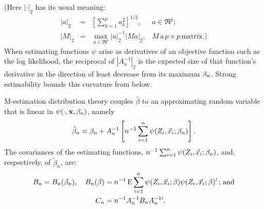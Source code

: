 \documentclass{article}
\theoremstyle{remark}
\begin{document}
(Here $| \cdot |_{2}$ has its usual meaning:
\begin{equation*}
  \begin{array}{rclr}
    |{a}|_{2} & = & \left[ \sum_{k=1}^{p} a_{k}^{2} \right]^{1/2}, & a \in \Re^{p};\\    |M|_{2} & = & \max_{a \in \Re^{p} } {|a|_{2}^{-1}}{|Ma|_{2}},& M\, \mathrm{a}\, p\times p\, \mathrm{matrix}.)
  \end{array}
\end{equation*}
When estimating functions $\psi$ arise as derivatives of an objective function such as the log likelihood, the reciprocal of $|{A}_{n}^{-1}|_{2}$ is the expected size of that function's derivative in the direction of least decrease from its maximum $\beta_{n }$. 
Strong estimability bounds this curvature from below.

M-estimation distribution theory couples $\hat\beta$ to an approximating random variable that is linear in $\psi(\cdot, \mathbf{x}, \beta_{n })$, namely 
\begin{equation}
  \label{eq:22}
  \tilde{\beta}_{n} \equiv \beta_{n } + A_{n}^{-1} \left[n^{-1}\sum_{i=1}^{n} \psi(Z_{i}, \vec{x}_{i}; \beta_{n } )\right].  
\end{equation}
The covariances of the estimating functions, $n^{-1} \sum_{i=1}^{n} \psi(Z_{i}, \vec{x}_{i}; \beta_{n } )$, and, respectively, of $\tilde{\beta}_{n}$, are: 
\begin{align}
\label{eq:13}
B_{n}  =  B_{n}(\beta_{n }),\quad B_{n}(\beta) &= n^{-1}\operatorname{E}  \sum_{i=1}^{n} \psi(Z_{i}, \vec{x}_{i}; \beta ) \psi(Z_{i}, \vec{x}_{i};  \beta )'\, ; \, \mathrm{and}\\
 C_{n} &= n^{-1}A_{n}^{-1}B_{n}A_{n}^{-1\prime}.\nonumber
\end{align}
\end{document}
